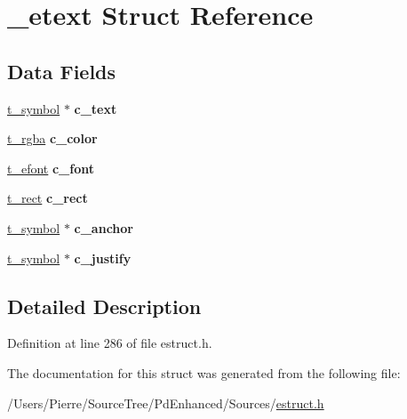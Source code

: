 \hypertarget{struct__etext}{\section{\-\_\-etext Struct Reference}
\label{struct__etext}
}
\subsection*{Data Fields}
\begin{DoxyCompactItemize}
\item 
\hypertarget{struct__etext_ac054c96b035a5f1a859bc8e46b636920}{\hyperlink{struct__symbol}{t\-\_\-symbol} $\ast$ {\bfseries c\-\_\-text}}\label{struct__etext_ac054c96b035a5f1a859bc8e46b636920}

\item 
\hypertarget{struct__etext_a8c9f65e6b5d93662d9b40a38b40a3a91}{\hyperlink{struct__rgba}{t\-\_\-rgba} {\bfseries c\-\_\-color}}\label{struct__etext_a8c9f65e6b5d93662d9b40a38b40a3a91}

\item 
\hypertarget{struct__etext_a5a04aa88bfa7e501cc22e79911ec6322}{\hyperlink{struct__efont}{t\-\_\-efont} {\bfseries c\-\_\-font}}\label{struct__etext_a5a04aa88bfa7e501cc22e79911ec6322}

\item 
\hypertarget{struct__etext_a3ad11827ad04fba1ba8cb1d853ad18dc}{\hyperlink{struct__rect}{t\-\_\-rect} {\bfseries c\-\_\-rect}}\label{struct__etext_a3ad11827ad04fba1ba8cb1d853ad18dc}

\item 
\hypertarget{struct__etext_aa5be622725b7ca85ad685a94104ab3fd}{\hyperlink{struct__symbol}{t\-\_\-symbol} $\ast$ {\bfseries c\-\_\-anchor}}\label{struct__etext_aa5be622725b7ca85ad685a94104ab3fd}

\item 
\hypertarget{struct__etext_a882eef71064831d5e3671b5a06cd0a1d}{\hyperlink{struct__symbol}{t\-\_\-symbol} $\ast$ {\bfseries c\-\_\-justify}}\label{struct__etext_a882eef71064831d5e3671b5a06cd0a1d}

\end{DoxyCompactItemize}


\subsection{Detailed Description}


Definition at line 286 of file estruct.\-h.



The documentation for this struct was generated from the following file\-:\begin{DoxyCompactItemize}
\item 
/\-Users/\-Pierre/\-Source\-Tree/\-Pd\-Enhanced/\-Sources/\hyperlink{estruct_8h}{estruct.\-h}\end{DoxyCompactItemize}
